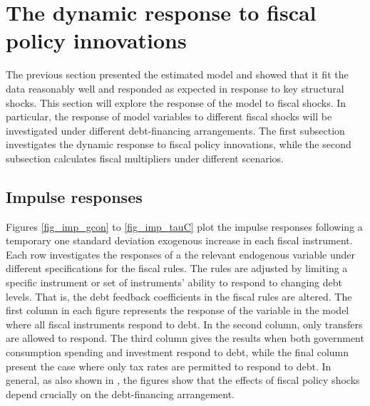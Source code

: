 \documentclass[a4paper,11pt]{article}
\numberwithin{equation}{section}
\begin{document}
	\section{The dynamic response to fiscal policy innovations} \label{simulations}
	
	The previous section presented the estimated model and showed that it fit the data reasonably well and responded as expected in response to key structural shocks. This section will explore the response of the model to fiscal shocks. In particular, the response of model variables to different fiscal shocks will be investigated under different debt-financing arrangements. The first subsection investigates the dynamic response to fiscal policy innovations, while the second subsection calculates fiscal multipliers under different scenarios.
	
	\subsection{Impulse responses}
	
	Figures \ref{fig_imp_gcon} to \ref{fig_imp_tauC} plot the impulse responses following a temporary one standard deviation exogenous increase in each fiscal instrument. Each row investigates the responses of a the relevant endogenous variable under different specifications for the fiscal rules. The rules are adjusted by limiting a specific instrument or set of instruments' ability to respond to changing debt levels. That is, the debt feedback coefficients in the fiscal rules are altered. The first column in each figure represents the response of the variable in the model where all fiscal instruments respond to debt. In the second column, only transfers are allowed to respond. The third column gives the results when both government consumption spending and investment respond to debt, while the final column present the case where only tax rates are permitted to respond to debt. In general, as also shown in \cite{leeper2010}, the figures show that the effects of fiscal policy shocks depend crucially on the debt-financing arrangement.
	
\end{document}
